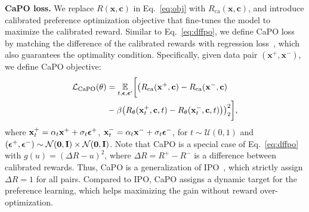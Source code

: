 \vspace{1mm}
\noindent
{\bf CaPO loss.}
We replace $R(\mathbf{x}, \mathbf{c})$ in Eq.~\eqref{eq:obj} with $R_{\textrm{ca}}(\mathbf{x}, \mathbf{c})$, and introduce calibrated preference optimization objective that fine-tunes the model to maximize the calibrated reward. 
Similar to Eq.~\eqref{eq:dffpo}, we define CaPO loss by matching the difference of the calibrated rewards with regression loss~\citep{deng2024prdp, fisch2024robust}, which also guarantees the optimality condition. 
Specifically, given data pair $(\mathbf{x}^+, \mathbf{x}^-)$, we define CaPO objective:
\vspace{-1mm}
\begin{align}\label{eq:capoloss}
\begin{split}
    \mathcal{L}_{\textrm{CaPO}}(\theta) &= \underset{t,\boldsymbol{\epsilon}, \boldsymbol{\epsilon}'}{\mathbb{E}}\bigg[
    \big( R_{\textrm{ca}}(\mathbf{x}^+, \mathbf{c}) - R_{\textrm{ca}}(\mathbf{x}^-, \mathbf{c}) \\
    &- \beta \big(R_\theta(\mathbf{x}_t^+,\mathbf{c},t) - R_\theta(\mathbf{x}_t^-, \mathbf{c}, t)\big)\big)_2^2\bigg]\text{,}
\end{split}
\end{align}
where $\mathbf{x}_t^+=\alpha_t\mathbf{x}^+ + \sigma_t\boldsymbol{\epsilon}^+$, $\mathbf{x}_t^-=\alpha_t\mathbf{x}^- + \sigma_t\boldsymbol{\epsilon}^-$, for $t\sim\mathcal{U}(0,1)$ and $(\boldsymbol{\epsilon}^+, \boldsymbol{\epsilon}^-)\sim \mathcal{N}(\boldsymbol{0},\mathbf{I}) \times \mathcal{N}(\boldsymbol{0},\mathbf{I})$.
Note that CaPO is a special case of Eq.~\eqref{eq:dffpo} with $g(u)=(\Delta R - u)^2$, where $\Delta R = R^+ - R^- $ is a difference between calibrated rewards.
Thus, CaPO is a generalization of IPO~\citep{azar2024general}, which strictly assign $\Delta R = 1$ for all pairs.
Compared to IPO, CaPO assigns a dynamic target for the preference learning, which helps maximizing the gain without reward over-optimization. 

